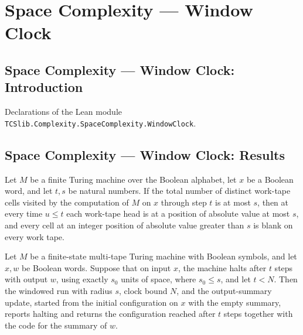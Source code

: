 \section{Space Complexity --- Window Clock}
\subsection*{Space Complexity --- Window Clock: Introduction}

Declarations of the Lean module \texttt{TCSlib.Complexity.SpaceComplexity.WindowClock}.

\subsection*{Space Complexity --- Window Clock: Results}

\begin{theorem}
\label{Turing.FinTM.inWindow_of_spaceUsed_le}
\leanok
{}
Let $M$ be a finite Turing machine over the Boolean alphabet, let $x$ be a Boolean word,
and let $t,s$ be natural numbers. If the total number of distinct work-tape cells
visited by the computation of $M$ on $x$ through step $t$ is at most $s$, then at every
time $u\le t$ each work-tape head is at a position of absolute value at most $s$, and
every cell at an integer position of absolute value greater than $s$ is blank on every
work tape.
\end{theorem}

\begin{theorem}
\label{Turing.windowRun_summary_of_halts}
\leanok
{}
Let $M$ be a finite-state multi-tape Turing machine with Boolean symbols, and let $x,w$
be Boolean words. Suppose that on input $x$, the machine halts after $t$ steps with
output $w$, using exactly $s_0$ units of space, where $s_0\le s$, and let $t<N$. Then
the windowed run with radius $s$, clock bound $N$, and the output-summary update,
started from the initial configuration on $x$ with the empty summary, reports halting
and returns the configuration reached after $t$ steps together with the code for the
summary of $w$.
\end{theorem}

